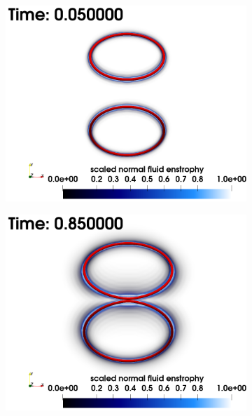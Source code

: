 \documentclass[%
 reprint,
 amsmath,amssymb,
 aps,
 prl,
]{revtex4-2}
\begin{document}
\begin{figure}[t]
\begin{subfigure}[b]{0.24\textwidth}
		\includegraphics*[width=\textwidth]{snap-5.png}
	\end{subfigure}
	\begin{subfigure}[b]{0.24\textwidth}
		\centering
		\includegraphics*[width=\textwidth]{snap-6.png}
	\end{subfigure}
    \begin{subfigure}[b]{0.24\textwidth}
		\centering

\end{subfigure}
\end{figure}
\end{document}
